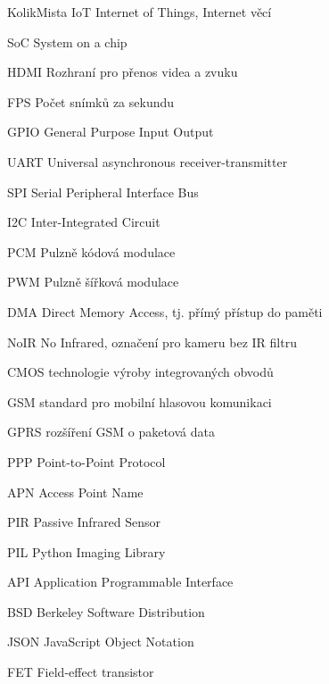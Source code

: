 \begin{seznamzkratek}{KolikMista}
%
{IoT}%
{Internet of Things, Internet věcí}

%
{SoC}%
{System on a chip}

%
{HDMI}%
{Rozhraní pro přenos videa a zvuku}

%
{FPS}%
{Počet snímků za sekundu}

%
{GPIO}%
{General Purpose Input Output}

%
{UART}%
{Universal asynchronous receiver-transmitter}

%
{SPI}%
{Serial Peripheral Interface Bus}

%
{I2C}%
{Inter-Integrated Circuit}

%
{PCM}%
{Pulzně kódová modulace}

%
{PWM}%
{Pulzně šířková modulace}

%
{DMA}%
{Direct Memory Access, tj. přímý přístup do paměti}

%
{NoIR}%
{No Infrared, označení pro kameru bez IR filtru}

%
{CMOS}%
{technologie výroby integrovaných obvodů}

%
{GSM}
{standard pro mobilní hlasovou komunikaci}%

%
{GPRS}%
{rozšíření GSM o paketová data}

%
{PPP}%
{Point-to-Point Protocol}

%
{APN}
{Access Point Name}%



%
{PIR}%
{Passive Infrared Sensor}


%
{PIL}%
{Python Imaging Library}


%
{API}%
{Application Programmable Interface}


%
{BSD}%
{Berkeley Software Distribution}


%
{JSON}%
{JavaScript Object Notation}


%
{FET}%
{Field-effect transistor}


\novazkratka{}%
{}%
{}



\end{seznamzkratek}
